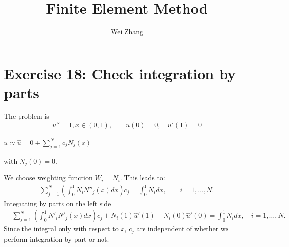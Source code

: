 \documentclass{article}
\begin{document}
\title{Finite Element Method}
\author{Wei Zhang}
\large
\maketitle


\section{Exercise 18: Check integration by parts}
The problem is
\begin{gather}
u''=1, x\in(0, 1), \qquad  u(0)=0, \quad u'(1)=0
\end{gather}
\begin{center}
$u\approx \hat{u}=0+\displaystyle \sum^{N}_{j=1}c_{j}N_{j}(x)$
\end{center}
with $N_{j}(0)=0$.\par 
We choose weighting function $W_{i}=N_{i}$. This leads to:
\begin{gather}
\displaystyle \sum^{N}_{j=1}\left(\int^{1}_{0} N_{i}N''_{j}(x)dx\right)c_{j}=\int^{1}_{0} N_{i}dx, \qquad i=1, \ldots, N.
\end{gather}
Integrating by parts on the left side
\begin{gather}
\displaystyle -\sum^{N}_{j=1}\left(\int^{1}_{0} N'_{i}N'_{j}(x)dx\right)c_{j}+N_{i}(1)\hat{u}'(1)-N_{i}(0)\hat{u}'(0)=\int^{1}_{0} N_{i}dx, \quad i=1, \ldots, N.
\end{gather}
Since the integral only  with respect to $x$, $c_{j}$ are independent of whether we perform integration by part or not.
\end{document}
